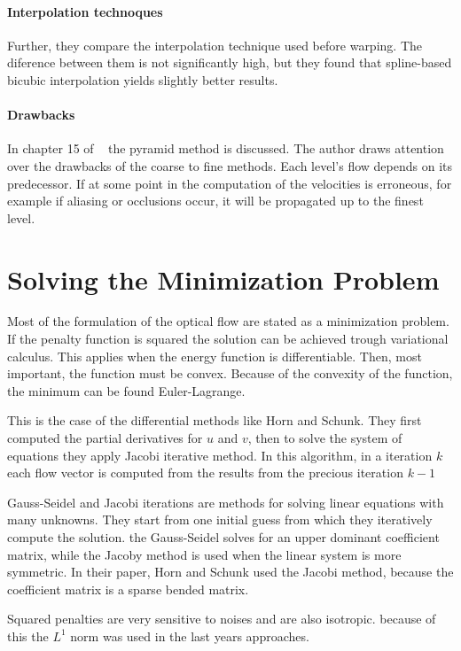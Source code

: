 \documentclass[12pt,a4paper,twoside]{report}
\begin{document}
{\paragraph{Interpolation technoques} Further, they compare the interpolation technique used before warping.
The diference between them is not significantly high, but they found that spline-based bicubic interpolation yields slightly better results.

\paragraph{Drawbacks}In chapter 15 of ~\cite{fleet2006} the pyramid method is discussed. The author draws attention over the drawbacks of the coarse to fine methods. Each level's flow depends on its predecessor. If at some point in the computation of the velocities is erroneous, for example if aliasing or occlusions occur, it will be propagated up to the finest level.
 
\section{Solving the Minimization Problem}
Most of the formulation of the optical flow are stated as a minimization problem. If the penalty function is squared the solution can be achieved trough variational calculus. This applies when the energy function is differentiable. Then, most important, the function must be convex. Because of the convexity of the function, the minimum can be found Euler-Lagrange. 

This is the case of the differential methods like Horn and Schunk. They first computed the partial derivatives for $u$ and $v$, then to solve the system of equations they apply Jacobi iterative method. In this algorithm, in a iteration $k$ each flow vector is computed from the results from the precious iteration $k-1$

Gauss-Seidel and Jacobi iterations are methods for solving linear equations with many unknowns. They start from one initial guess from which they iteratively compute the solution. the Gauss-Seidel solves for an upper dominant coefficient matrix, while the Jacoby method is used when the linear system is more symmetric. In their paper, Horn and Schunk used the Jacobi method, because the coefficient matrix is a sparse bended matrix.

Squared penalties are very sensitive to noises and are also isotropic. because of this the $L^1$ norm was used in the last years approaches.

}
\end{document}
